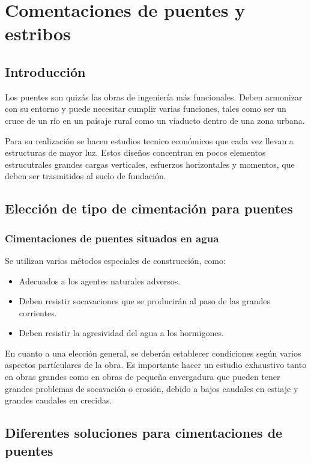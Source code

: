 \documentclass[../main.tex]{subfiles}
\begin{document}
\section{Comentaciones de puentes y estribos}
\subsection{Introducción}

Los puentes son quizás las obras de ingeniería más funcionales. Deben armonizar
con su entorno y puede necesitar cumplir varias funciones, tales como ser un 
cruce de un río en un paisaje rural como un viaducto dentro de una zona urbana.

Para su realización se hacen estudios tecnico económicos que cada vez llevan a 
estructuras de mayor luz. Estos diseños concentran en pocos elementos estrucutrales
grandes cargas verticales, esfuerzos horizontales y momentos, que deben ser 
trasmitidos al suelo de fundación.

\subsection{Elección de tipo de cimentación para puentes}


\subsubsection{Cimentaciones de puentes situados en agua}

Se utilizan varios métodos especiales de construcción, como:

\begin{itemize}
  \item Adecuados a los agentes naturales adversos.
  \item Deben resistir socavaciones que se producirán al paso de las grandes
    corrientes.
  \item Deben resistir la agresividad del agua a los hormigones.
\end{itemize}

En cuanto a una elección general, se deberán establecer condiciones según varios
aspectos partículares de la obra. Es importante hacer un estudio exhaustivo tanto
en obras grandes como en obras de pequeña envergadura que pueden tener grandes
problemas de socavación o erosión, debido a bajos caudales en estiaje y grandes
caudales en crecidas. 

\subsection*{Diferentes soluciones para cimentaciones de puentes}
\end{document}
